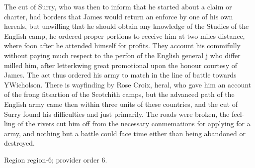 \documentclass[11pt]{article}
\begin{document}
The cut of Surry, who was then to inform that he started about a claim or charter, had borders that James would return an enforce by one of his own hereals, but unwilling that he should obtain any knowledge of the Studies of the English camp, he ordered proper portions to receive him at two miles distance, where foon after he attended himself for profits. They account his commifully without paying much respect to the perfon of the English general j who differ milled him, after letterkwing great promotional upon the honour courtesy of James. The act thus ordered his army to match in the line of battle towards YWicholson. There is wayfinding by Rose Croix, heral, who gave him an account of the frong fitsartion of the Scotchith camps, but the advanced path of the English army came then within three units of these countries, and the cut of Surry found his difficulties and just primarily. The roads were broken, the feel-ling of the rivers cut him off from the necessary conmemations for applying for a army, and nothing but a battle could face time either than being abandoned or destroyed.
\par

{\scriptsize\color{gray} Region region-6; provider order 6.\par}
\medskip
\end{document}
